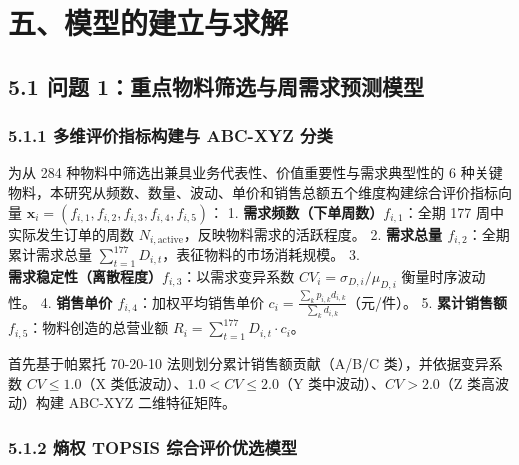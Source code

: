 \section{五、模型的建立与求解}\label{ux4e94ux6a21ux578bux7684ux5efaux7acbux4e0eux6c42ux89e3}

\subsection{5.1 问题
1：重点物料筛选与周需求预测模型}\label{ux95eeux9898-1ux91cdux70b9ux7269ux6599ux7b5bux9009ux4e0eux5468ux9700ux6c42ux9884ux6d4bux6a21ux578b}

\subsubsection{5.1.1 多维评价指标构建与 ABC-XYZ
分类}\label{ux591aux7ef4ux8bc4ux4ef7ux6307ux6807ux6784ux5efaux4e0e-abc-xyz-ux5206ux7c7b}

为从 284 种物料中筛选出兼具业务代表性、价值重要性与需求典型性的 6
种关键物料，本研究从频数、数量、波动、单价和销售总额五个维度构建综合评价指标向量
\(\boldsymbol{x}_i = (f_{i,1}, f_{i,2}, f_{i,3}, f_{i,4}, f_{i,5})\)：
1. \textbf{需求频数（下单周数）\(f_{i,1}\)}：全期 177
周中实际发生订单的周数 \(N_{i,\text{active}}\)，反映物料需求的活跃程度。
2. \textbf{需求总量 \(f_{i,2}\)}：全期累计需求总量
\(\sum_{t=1}^{177} D_{i,t}\)，表征物料的市场消耗规模。 3.
\textbf{需求稳定性（离散程度）\(f_{i,3}\)}：以需求变异系数
\(CV_i = \sigma_{D,i} / \mu_{D,i}\) 衡量时序波动性。 4. \textbf{销售单价
\(f_{i,4}\)}：加权平均销售单价
\(c_i = \frac{\sum_{k} p_{i,k} d_{i,k}}{\sum_k d_{i,k}}\)（元/件）。 5.
\textbf{累计销售额 \(f_{i,5}\)}：物料创造的总营业额
\(R_i = \sum_{t=1}^{177} D_{i,t} \cdot c_i\)。

首先基于帕累托 70-20-10 法则划分累计销售额贡献（A/B/C
类），并依据变异系数 \(CV \le 1.0\)（X
类低波动）、\(1.0 < CV \le 2.0\)（Y 类中波动）、\(CV > 2.0\)（Z
类高波动）构建 ABC-XYZ 二维特征矩阵。

\subsubsection{5.1.2 熵权 TOPSIS
综合评价优选模型}\label{ux71b5ux6743-topsis-ux7efcux5408ux8bc4ux4ef7ux4f18ux9009ux6a21ux578b}

